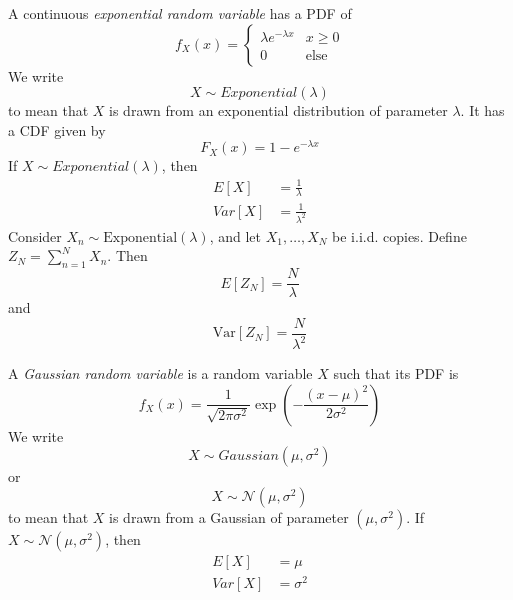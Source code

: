 A continuous \emph{exponential random variable}
has a PDF of
\begin{equation}
    f_X(x) = \begin{cases}
        \lambda e^{-\lambda x} & x \geq 0    \\
        0                      & \text{else}
    \end{cases}
\end{equation}
We write
\begin{equation}
    X \sim Exponential(\lambda)
\end{equation}
to mean that $X$ is drawn from an
exponential distribution of parameter
$\lambda$. It has a CDF given by
\begin{equation}
    F_X(x) = 1 - e^{-\lambda x}
\end{equation}
If $X \sim Exponential(\lambda)$, then
\begin{align}
    E[X]   & = \frac{1}{\lambda}   \\
    Var[X] & = \frac{1}{\lambda^2}
\end{align}
Consider $X_n \sim \text{Exponential}(\lambda)$, and let
$X_1, \dots, X_N$ be i.i.d. copies. Define
$Z_N = \sum_{n=1}^{N} X_n$. Then
\begin{equation}
    E[Z_N] = \frac{N}{\lambda}
\end{equation}
and
\begin{equation}
    \text{Var}[Z_N] = \frac{N}{\lambda^2}
\end{equation}


A \emph{Gaussian random variable} is a
random variable $X$ such that its PDF
is
\begin{equation}
    f_X(x) = \frac{1}{\sqrt{2\pi \sigma^2}}\exp\left(-\frac{(x-\mu)^2}{2\sigma^2}\right)
\end{equation}
We write
\begin{equation}
    X \sim Gaussian(\mu, \sigma^2)
\end{equation}
or
\begin{equation}
    X \sim \mathcal{N}\left(\mu, \sigma^2\right)
\end{equation}
to mean that $X$ is drawn from a Gaussian
of parameter $(\mu, \sigma^2)$.
If $X \sim \mathcal{N}(\mu, \sigma^2)$, then
\begin{align}
    E[X]   & = \mu      \\
    Var[X] & = \sigma^2
\end{align}


